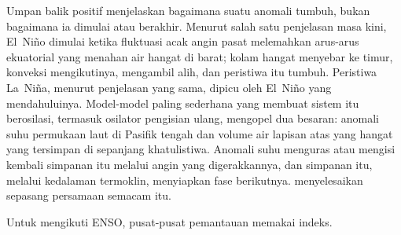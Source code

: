 \begin{omfigure}
\centering
{}
\par{}
\end{omfigure}

Umpan balik positif menjelaskan bagaimana suatu anomali tumbuh, bukan bagaimana ia dimulai atau berakhir. Menurut salah satu penjelasan masa kini,
El~Niño dimulai ketika fluktuasi acak angin pasat melemahkan arus-arus ekuatorial yang
menahan air hangat di barat; kolam hangat menyebar ke timur, konveksi mengikutinya,
 mengambil alih, dan peristiwa itu tumbuh. Peristiwa La~Niña, menurut penjelasan yang sama,
dipicu oleh El~Niño yang mendahuluinya. Model-model paling sederhana yang membuat sistem itu berosilasi, termasuk osilator
pengisian ulang, mengopel dua besaran: anomali suhu permukaan laut di Pasifik
tengah dan volume air lapisan atas yang hangat yang tersimpan di sepanjang khatulistiwa. Anomali
suhu menguras atau mengisi kembali simpanan itu melalui angin yang digerakkannya, dan simpanan itu, melalui
kedalaman termoklin, menyiapkan fase berikutnya.  menyelesaikan
sepasang persamaan semacam itu.

Untuk mengikuti ENSO, pusat-pusat pemantauan memakai indeks.


